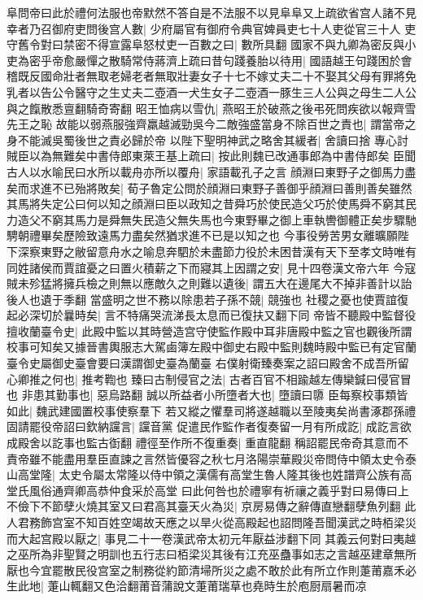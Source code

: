 阜問帝曰此於禮何法服也帝默然不答自是不法服不以見阜阜又上疏欲省宫人諸不見幸者乃召御府吏問後宫人數|{
	少府屬官有御府令典官婢員吏七十人吏從官三十人}
吏守舊令對曰禁密不得宣露阜怒杖吏一百數之曰|{
	數所具翻}
國家不與九卿為密反與小吏為密乎帝愈嚴憚之散騎常侍蔣濟上疏曰昔句踐養胎以待用|{
	國語越王句踐困於會稽既反國命壯者無取老婦老者無取壯妻女子十七不嫁丈夫二十不娶其父母有罪將免乳者以告公令醫守之生丈夫二壺酒一犬生女子二壺酒一豚生三人公與之母生二人公與之餼散悉亶翻騎奇寄翻}
昭王恤病以雪仇|{
	燕昭王於破燕之後弔死問疾欲以報齊雪先王之恥}
故能以弱燕服強齊羸越滅勁吳今二敵強盛當身不除百世之責也|{
	謂當帝之身不能滅吳蜀後世之責必歸於帝}
以陛下聖明神武之略舍其緩者|{
	舍讀曰捨}
專心討賊臣以為無難矣中書侍郎東萊王基上疏曰|{
	按此則魏已改通事郎為中書侍郎矣}
臣聞古人以水喻民曰水所以載舟亦所以覆舟|{
	家語載孔子之言}
顔淵曰東野子之御馬力盡矣而求進不已殆將敗矣|{
	荀子魯定公問於顔淵曰東野子善御乎顔淵曰善則善矣雖然其馬將失定公曰何以知之顔淵曰臣以政知之昔舜巧於使民造父巧於使馬舜不窮其民力造父不窮其馬力是舜無失民造父無失馬也今東野畢之御上車執轡御體正矣步驟馳騁朝禮畢矣歷險致遠馬力盡矣然猶求進不已是以知之也}
今事役勞苦男女離曠願陛下深察東野之敝留意舟水之喻息奔駟於未盡節力役於未困昔漢有天下至孝文時唯有同姓諸侯而賈誼憂之曰置火積薪之下而寢其上因謂之安|{
	見十四卷漢文帝六年}
今寇賊未殄猛將擁兵檢之則無以應敵久之則難以遺後|{
	謂五大在邊尾大不掉非善計以詒後人也遺于季翻}
當盛明之世不務以除患若子孫不競|{
	競強也}
社稷之憂也使賈誼復起必深切於曩時矣|{
	言不特痛哭流涕長太息而已復扶又翻下同}
帝皆不聽殿中監督役擅收蘭臺令史|{
	此殿中監以其時營造宫守使監作殿中耳非唐殿中監之官也觀後所謂校事可知矣又據晉書輿服志大駕鹵簿左殿中御史右殿中監則魏時殿中監已有定官蘭臺令史屬御史臺會要曰漢謂御史臺為蘭臺}
右僕射衛臻奏案之詔曰殿舍不成吾所留心卿推之何也|{
	推考鞫也}
臻曰古制侵官之法|{
	古者百官不相踰越左傳欒鍼曰侵官冒也}
非患其勤事也|{
	惡烏路翻}
誠以所益者小所墮者大也|{
	墮讀曰隳}
臣每察校事類皆如此|{
	魏武建國置校事使察羣下}
若又縱之懼羣司將遂越職以至陵夷矣尚書涿郡孫禮固請罷役帝詔曰欽納讜言|{
	讜音黨}
促遣民作監作者復奏留一月有所成訖|{
	成訖言欲成殿舍以訖事也監古衘翻}
禮徑至作所不復重奏|{
	重直龍翻}
稱詔罷民帝奇其意而不責帝雖不能盡用羣臣直諫之言然皆優容之秋七月洛陽崇華殿災帝問侍中領太史令泰山高堂隆|{
	太史令屬太常隆以侍中領之漢儒有高堂生魯人隆其後也姓譜齊公族有高堂氏風俗通齊卿高恭仲食采於高堂}
曰此何咎也於禮寧有祈禳之義乎對曰易傳曰上不儉下不節孽火燒其室又曰君高其臺天火為災|{
	京房易傳之辭傳直戀翻孽魚列翻}
此人君務飾宫室不知百姓空竭故天應之以旱火從高殿起也詔問隆吾聞漢武之時栢梁災而大起宫殿以厭之|{
	事見二十一卷漢武帝太初元年厭益涉翻下同}
其義云何對曰夷越之巫所為非聖賢之明訓也五行志曰栢梁災其後有江充巫蠱事如志之言越巫建章無所厭也今宜罷散民役宫室之制務從約節清埽所災之處不敢於此有所立作則萐莆嘉禾必生此地|{
	萐山輒翻又色洽翻莆音蒲說文萐莆瑞草也堯時生於庖厨扇暑而凉}
